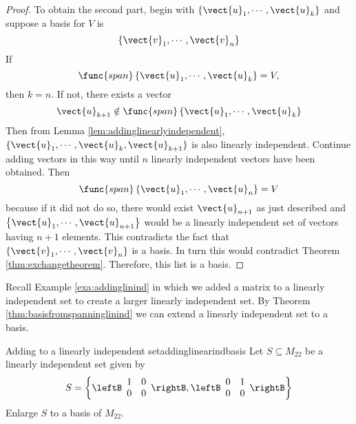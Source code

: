 \begin{proof}
To obtain the second part, begin with $\{\vect{u}_{1},\cdots ,\vect{u}
_{k}\}$ and suppose a basis for $V$ is 
\begin{equation*}
\left\{ \vect{v}_{1},\cdots ,\vect{v}_{n}\right\} 
\end{equation*}
If 
\begin{equation*}
\func{span}\left\{ \vect{u}_{1},\cdots ,\vect{u}_{k}\right\} =V,
\end{equation*}
then $k=n$. If not, there exists a vector 
\begin{equation*}
\vect{u}_{k+1}\notin \func{span}\left\{ \vect{u}_{1},\cdots ,\vect{u}
_{k}\right\}
\end{equation*}
Then from Lemma \ref{lem:addinglinearlyindependent}, $\{\vect{u}_{1},\cdots ,\vect{u}_{k},
\vect{u}_{k+1}\}$ is also linearly independent. Continue adding vectors in
this way until $n$ linearly independent vectors have been obtained. Then 
\begin{equation*}
\func{span}\left\{ \vect{u}_{1},\cdots ,\vect{u}_{n}\right\} =V
\end{equation*}
because if it did not do so, there would exist $\vect{u}_{n+1}$ as just
described and $\left\{ \vect{u}_{1},\cdots ,\vect{u}_{n+1}\right\} $
would be a linearly independent set of vectors having $n+1$ elements. This contradicts the fact that $\left\{ \vect{v}_{1},\cdots ,\vect{v}_{n}\right\} $ is a basis.
 In turn this would contradict Theorem \ref{thm:exchangetheorem}. Therefore, this list is a
basis. 
\end{proof}

Recall Example \ref{exa:addinglinind} in which we added a matrix to a linearly independent set to create a larger linearly independent set. By Theorem \ref{thm:basisfromspanninglinind} we can extend a linearly independent set to a basis.  

\begin{example}{Adding to a linearly independent set}{addinglinearindbasis}
Let $S \subseteq M_{22}$ be a linearly independent set given by 
\[
S  = \left\{ \leftB \begin{array}{rr}
1 & 0 \\
0 & 0 
\end{array} \rightB, \leftB \begin{array}{rr}
0 & 1 \\
0 & 0 
\end{array} \rightB \right\}
\]
Enlarge $S$ to a basis of $M_{22}$. 
\end{example}

